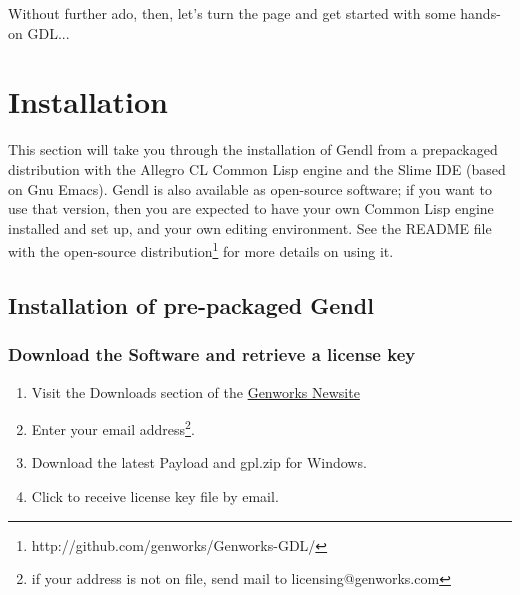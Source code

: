 \documentclass [11pt]{book}
\begin{document}
Without further ado, then, let's turn the page and get started with some hands-on GDL...

\chapter{Installation}

\label{chap:installation}

This section will take you through the installation of Gendl
from a prepackaged distribution with the Allegro CL Common Lisp engine
and the Slime IDE (based on Gnu Emacs). Gendl is also available as
open-source software; if you want to use that version, then you are
expected to have your own Common Lisp engine installed and set up, and
your own editing environment. See the README file with the open-source
distribution\footnote{http://github.com/genworks/Genworks-GDL/} for more details on using it.

\section{Installation of pre-packaged Gendl}

\label{sec:installationofpre-packagedgendl}



\subsection{Download the Software and retrieve a license key}

\label{subsec:downloadthesoftwareandretrievealicensekey}



\begin{enumerate}

\item Visit the Downloads section of the \href{http://genworks.com/newsite}{Genworks Newsite}

\item Enter your email address\footnote{if your address is not on file, send mail to licensing@genworks.com}.

\item Download the latest Payload and gpl.zip for Windows.

\item Click to receive license key file by email.

\end{enumerate}
\end{document}
